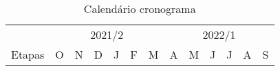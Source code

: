 \begin{table}[h]
\centering
	\caption{\label{tab:calendario_cronograma}Calendário cronograma}
	\begin{tabular}{|c|cccccccccccc|cccccccccccc|}
		\hline
		& \multicolumn{12}{c|}{2021/2}                                                                                                                                                                                                                                                                                                                                                                                                                                                                                                                     & \multicolumn{12}{c|}{2022/1}                                                                                                                                                                                                                                                                                                                                                                                                                                                                                                                     \\ \cline{2-25} 
		\multirow{-2}{*}{Etapas} & \multicolumn{2}{c|}{O}                                                & \multicolumn{2}{c|}{N}                                                                        & \multicolumn{2}{c|}{D}                                                                        & \multicolumn{2}{c|}{J}                                                                        & \multicolumn{2}{c|}{F}                                                                        & \multicolumn{2}{c|}{M}                                                   & \multicolumn{2}{c|}{A}                                                                        & \multicolumn{2}{c|}{M}                                                                        & \multicolumn{2}{c|}{J}                                                                        & \multicolumn{2}{c|}{J}                                                                        & \multicolumn{2}{c|}{A}                                                                        & \multicolumn{2}{c|}{S}                           \\ \hline

\end{tabular}
\end{table}
